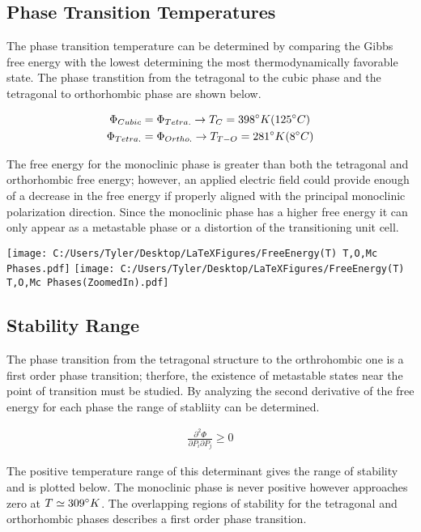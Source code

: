 \documentclass{article}
\begin{document}
\subsection{Phase Transition Temperatures}
The phase transition temperature can be determined by comparing the Gibbs free energy with the lowest determining the most thermodynamically favorable state.  The phase transtition from the tetragonal to the cubic phase and the tetragonal to orthorhombic phase are shown below.

\begin{align}
\Phi_{Cubic} &= \Phi_{Tetra.} \to T_C = 398 \degree K (125 \degree C) \\
\Phi_{Tetra.} &= \Phi_{Ortho.} \to T_{T-O} = 281 \degree K (8\degree C)
\end{align}

The free energy for the monoclinic phase is greater than both the tetragonal and orthorhombic free energy; however, an applied electric field could provide enough of a decrease in the free energy if properly aligned with the principal monoclinic polarization direction.  Since the monoclinic phase  has a higher free energy it can only appear as a metastable phase or a distortion of the transitioning unit cell.

\texttt{[image: C:/Users/Tyler/Desktop/LaTeXFigures/FreeEnergy(T) T,O,Mc Phases.pdf]}
\texttt{[image: C:/Users/Tyler/Desktop/LaTeXFigures/FreeEnergy(T) T,O,Mc Phases(ZoomedIn).pdf]}

\newpage
\subsection{Stability Range}

The phase transition from the tetragonal structure to the orthrohombic one is a first order phase transition; therfore, the existence of metastable states near the point of transition must be studied.  By analyzing the second derivative of the free energy for each phase the range of stabliity can be determined.

\begin{align}
\frac{\partial^2 \Phi}{\partial P_i \partial P_j} \geq 0
\end{align}

The positive temperature range of this determinant gives the range of stability and is plotted below.  The monoclinic phase is never positive however approaches zero at $T \simeq 309 \degree K$.  The overlapping regions of stability for the tetragonal and orthorhombic phases describes a first order phase transition.
\end{document}
